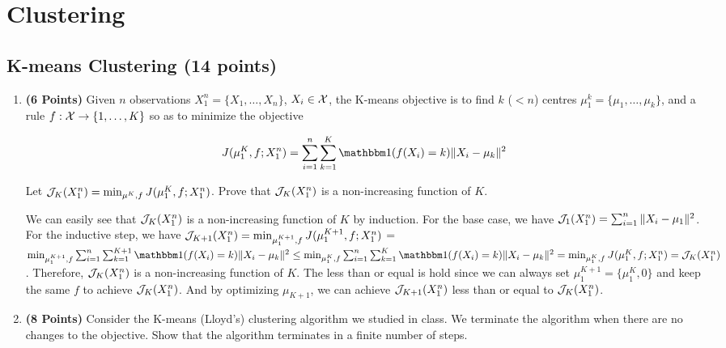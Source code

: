 \section{Clustering}

\subsection{K-means Clustering (14 points)}

\begin{enumerate}

\item \textbf{(6 Points)}
Given $n$ observations $X_1^n = \{X_1, \dots, X_n\}$, $X_i \in \mathcal{X}$, the K-means objective
is to find $k$
($<n$) centres $\mu_1^k = \{\mu_1, \dots, \mu_k\}$, and a rule $f:\mathcal{X} \rightarrow
\{1,\dots, K\}$ so as to minimize the objective

\begin{equation}
J(\mu_1^K, f; X_1^n) = \sum_{i=1}^n \sum_{k=1}^K \indfone(f(X_i) = k) \|X_i - \mu_k\|^2
\label{eqn:kmeans}
\end{equation}

Let $\mathcal{J}_K(X_1^n) = \min_{\mu^K, f} J(\mu_1^K, f; X_1^n)$. Prove that
$\mathcal{J}_{K}(X_1^n)$ is a non-increasing function of $K$.

\begin{soln}

    We can easily see that $\mathcal{J}_{K}(X_1^n)$ is a non-increasing function of $K$ by
    induction. For the base case, we have $\mathcal{J}_{1}(X_1^n) = \sum_{i=1}^n \|X_i -
    \mu_1\|^2 $. For the inductive step, we have $\mathcal{J}_{K+1}(X_1^n) = \min_{\mu_1^{K
    +1}, f} J(\mu_1^{K+1}, f; X_1^n)$ = $\min_{\mu_1^{K+1}, f} \sum_{i=1}^n \sum_{k=1}^
    {K+1} \indfone(f(X_i) = k) \|X_i - \mu_k\|^2 \leq \min_{\mu_1^{K}, f} \sum_{i=1}^n
    \sum_{k=1}^{K} \indfone(f(X_i) = k) \|X_i - \mu_k\|^2 = \min_{\mu_1^{K}, f} J(\mu_1^
    {K}, f; X_1^n) = \Jcal_{K}(X_1^n)$. Therefore, $\mathcal{J}_{K}(X_1^n)$ is a
    non-increasing function of $K$.
    The less than or equal is hold since we can always set $\mu_1^{K+1} = \{\mu_1^{K},0\}$
    and keep the same $f$ to achieve $\mathcal{J}_{K}(X_1^n)$. And by optimizing $\mu_{K+1}
    $, we can achieve $\mathcal{J}_{K+1}(X_1^n)$ less than or equal to $\mathcal{J}_{K}(X_1^n)$. 

\end{soln}

\item \textbf{(8 Points)}
Consider the K-means (Lloyd's) clustering algorithm we studied in class. We
terminate the algorithm when there are no changes to the objective.
Show that the algorithm terminates in a finite number of steps.


\end{enumerate}
